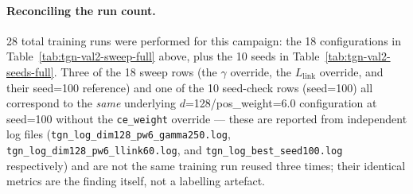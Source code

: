 \paragraph{Reconciling the run count.}
28 total training runs were performed for this campaign: the 18
configurations in Table~\ref{tab:tgn-val2-sweep-full} above, plus the 10
seeds in Table~\ref{tab:tgn-val2-seeds-full}. Three of the 18
sweep rows (the $\gamma$ override, the $L_{\text{link}}$ override, and
their seed=100 reference) and one of the 10 seed-check rows (seed=100)
all correspond to the \emph{same} underlying $d$=128/pos\_weight=6.0
configuration at seed=100 without the \texttt{ce\_weight} override —
these are reported from independent log files
(\texttt{tgn\_log\_dim128\_pw6\_gamma250.log},
\texttt{tgn\_log\_dim128\_pw6\_llink60.log}, and
\texttt{tgn\_log\_best\_seed100.log} respectively) and are not the same
training run reused three times; their identical metrics are the finding
itself, not a labelling artefact.
